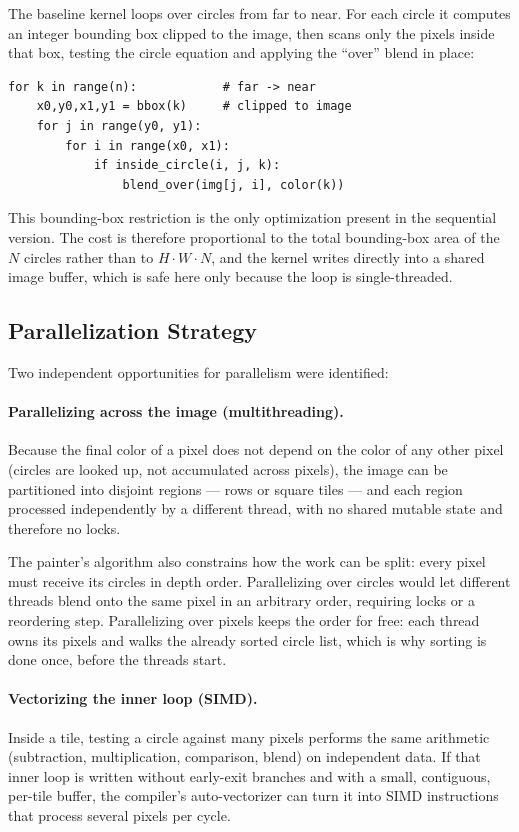 \documentclass[10pt,twocolumn,letterpaper]{article}
\begin{document}
The baseline kernel loops over circles from far to near. For each circle it
computes an integer bounding box clipped to the image, then scans only the
pixels inside that box, testing the circle equation and applying the ``over''
blend in place:

\begin{lstlisting}
for k in range(n):            # far -> near
    x0,y0,x1,y1 = bbox(k)     # clipped to image
    for j in range(y0, y1):
        for i in range(x0, x1):
            if inside_circle(i, j, k):
                blend_over(img[j, i], color(k))
\end{lstlisting}

This bounding-box restriction is the only optimization present in the
sequential version. The cost is therefore proportional to the total
bounding-box area of the $N$ circles rather than to $H\cdot W\cdot N$, and
the kernel writes directly into a shared image buffer, which is safe here
only because the loop is single-threaded.

\subsection{Parallelization Strategy}

Two independent opportunities for parallelism were identified:

\paragraph{Parallelizing across the image (multithreading).} Because the
final color of a pixel does not depend on the color of any other pixel
(circles are looked up, not accumulated across pixels), the image can be
partitioned into disjoint regions — rows or square tiles — and each region
processed independently by a different thread, with no shared mutable state
and therefore no locks.

The painter's algorithm also constrains how the work can be split: every
pixel must receive its circles in depth order. Parallelizing over circles
would let different threads blend onto the same pixel in an arbitrary
order, requiring locks or a reordering step. Parallelizing over pixels
keeps the order for free: each thread owns its pixels and walks the
already sorted circle list, which is why sorting is done once, before the
threads start.

\paragraph{Vectorizing the inner loop (SIMD).} Inside a tile, testing a
circle against many pixels performs the same arithmetic (subtraction,
multiplication, comparison, blend) on independent data. If that inner loop is
written without early-exit branches and with a small, contiguous, per-tile
buffer, the compiler's auto-vectorizer can turn it into SIMD instructions
that process several pixels per cycle.
\end{document}

